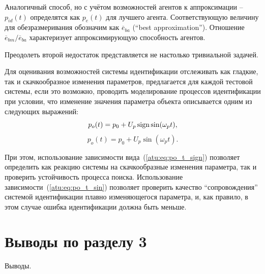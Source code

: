 Аналогичный способ, но с учётом возможностей агентов
к аппроксимации -- $p_{id}(t)$ определятся
как $p_e(t)$ для лучшего агента.
Соответствующую величину для обезразмеривания обозначим как
$\overline{e}_{ba}$ (``best approximation'').
Отношение $\overline{e}_{bm} / \overline{e}_{ba}$
характеризует аппроксимирующую способность агентов.


Преодолеть второй недостаток представляется не настолько тривиальной задачей.


Для оценивания возможностей системы идентификации
отслеживать как гладкие, так и скачкообразное изменения параметров,
предлагается для каждой тестовой системы, если это возможно,
проводить моделирование процессов идентификации при условии, что
изменение значения параметра объекта описывается одним из
следующих выражений:
%
\begin{equation}
  p_o(t) = p_0 +  U_{p} \operatorname*{sign} \sin( \omega_{p} t ),
  \label{atu:eq:po_t_sign}
\end{equation}
%
%
\begin{equation}
  p_o(t) = p_0 +  U_{p} \sin( \omega_{p} t ).
  \label{atu:eq:po_t_sin}
\end{equation}


При этом, использование зависимости вида~(\ref{atu:eq:po_t_sign})
позволяет определить как реакцию системы на скачкообразные
изменения параметра, так и проверить устойчивость процесса поиска.
Использование зависимости~(\ref{atu:eq:po_t_sin}) позволяет проверить
качество ``сопровождения'' системой идентификации плавно изменяющегося параметра,
и, как правило, в этом случае ошибка идентификации должна быть меньше.









\section{Выводы по разделу 3}  %

Выводы.



